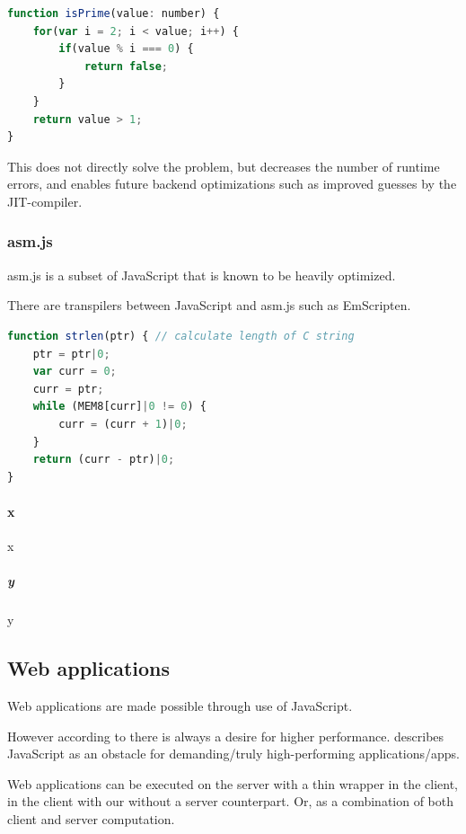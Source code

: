 \begin{lstlisting}[language=JavaScript,numbers=none,caption=prime.ts,frame=none]
function isPrime(value: number) {
    for(var i = 2; i < value; i++) {
        if(value % i === 0) {
            return false;
        }
    }
    return value > 1;
}
\end{lstlisting}

This does not directly solve the problem, but decreases the number of runtime errors, and enables future backend optimizations such as improved guesses by the JIT-compiler.

\subsubsection{asm.js}

asm.js is a subset of JavaScript that is known to be heavily optimized.

There are transpilers between JavaScript and asm.js such as EmScripten.

\begin{lstlisting}[language=JavaScript,numbers=none,caption=asm.js,frame=none]
function strlen(ptr) { // calculate length of C string
    ptr = ptr|0;
    var curr = 0;
    curr = ptr;
    while (MEM8[curr]|0 != 0) {
        curr = (curr + 1)|0;
    }
    return (curr - ptr)|0;
}
\end{lstlisting}

\blindtext

\paragraph{x}

x

\subparagraph{y}

y

\subsection*{Web applications}

Web applications are made possible through use of JavaScript.

However according to \textcite{ReiserBlaser2017} there is always a desire for higher performance. \textcite{Zakai2018} describes JavaScript as an obstacle for demanding/truly high-performing applications/apps.

Web applications can be executed on the server with a thin wrapper in the client, in the client with our without a server counterpart. Or, as a combination of both client and server computation.

